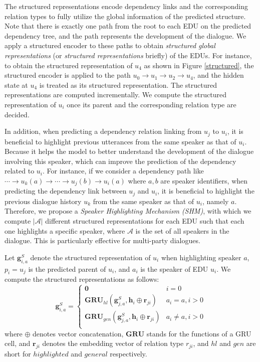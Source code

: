\documentclass[letterpaper]{article} \usepackage{aaai19}  \usepackage{times}  \usepackage{helvet}  \usepackage{courier}  \usepackage{url}  \usepackage{graphicx}  \usepackage{amssymb}
\begin{document}
\noindent The structured representations encode dependency links and the corresponding relation types to fully utilize the global information of the predicted structure.
Note that there is exactly one path from the root to each EDU on the predicted dependency tree, and the path represents the development of the dialogue.
We apply a structured encoder to these paths to obtain \emph{structured global representations} (or \emph{structured representations} briefly) of the EDUs.
For instance, to obtain the structured representation of $u_4$ as shown in Figure \ref{structured}, the structured encoder is applied to the path $u_0\rightarrow u_1\rightarrow u_2 \rightarrow u_4$, and the hidden state at $u_4$ is treated as its structured representation.
The structured representations are computed incrementally. We compute the structured representation of $u_i$ once its parent and the corresponding relation type are decided.

In addition, when predicting a dependency relation linking from $u_j$ to $u_i$, it is beneficial to highlight previous utterances from the same speaker as that of $u_i$. Because it helps the model to better understand the development of the dialogue involving this speaker, which can improve the prediction of the dependency related to $u_i$. 
For instance, if we consider a dependency path like $\cdots \rightarrow u_k(a)\rightarrow \cdots \rightarrow u_j(b) \rightarrow u_i(a)$ where $a,b$ are speaker identifiers, when predicting the dependency link between $u_j$ and $u_i$, it is beneficial to highlight the previous dialogue history $u_k$ from the same speaker as that of $u_i$, namely $a$.
Therefore, we propose a \emph{Speaker Highlighting Mechanism (SHM)}, with which we compute $|\mathcal{A}|$ different structured representations for each EDU such that each one highlights a specific speaker, where $\mathcal{A}$ is the set of all speakers in the dialogue.
This is particularly effective for multi-party dialogues.

Let $\bm{g}_{i,a}^S$ denote the structured representation of $u_i$ when highlighting speaker $a$, $p_i=u_j$ is the predicted parent of $u_i$, and $a_i$ is the speaker of EDU $u_i$. 
We compute the structured representations as follows:
\begin{equation}
\bm{g}_{i,a}^S=\left\{
\begin{array}{lcl}
\bm{0} & i=0\\
\mathbf{GRU}_{hl}(\bm{g}^S_{j,a}, \bm{h}_i \oplus \bm{r}_{ji} ) & a_i=a, i>0\\
\mathbf{GRU}_{gen}(\bm{g}^S_{j,a}, \bm{h}_i \oplus \bm{r}_{ji} ) & a_i\neq a, i>0\\
\end{array} \right.
\label{structured_representation}
\end{equation}
where $\oplus$ denotes vector concatenation, $\mathbf{GRU}$ stands for the functions of a GRU cell, and $\bm{r}_{ji}$ denotes the embedding vector of relation type $r_{ji}$, and $hl$ and $gen$ are short for $highlighted$ and $general$ respectively.
\end{document}
